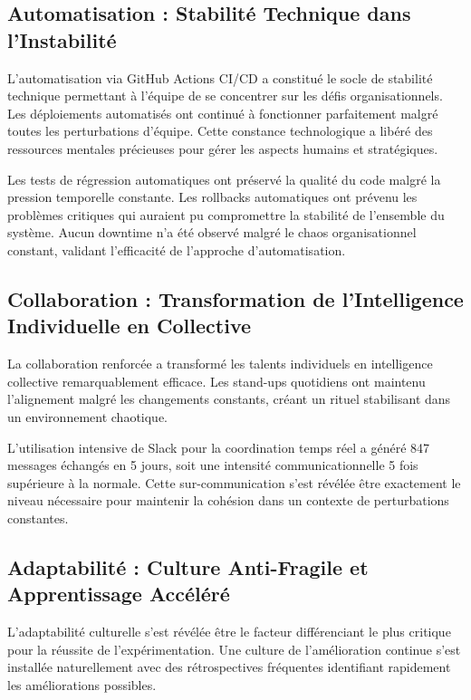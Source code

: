 \documentclass[12pt,a4paper]{article}
\begin{document}
\subsection{Automatisation : Stabilité Technique dans l'Instabilité}

L'automatisation via GitHub Actions CI/CD a constitué le socle de stabilité technique permettant à l'équipe de se concentrer sur les défis organisationnels. Les déploiements automatisés ont continué à fonctionner parfaitement malgré toutes les perturbations d'équipe. Cette constance technologique a libéré des ressources mentales précieuses pour gérer les aspects humains et stratégiques.

Les tests de régression automatiques ont préservé la qualité du code malgré la pression temporelle constante. Les rollbacks automatiques ont prévenu les problèmes critiques qui auraient pu compromettre la stabilité de l'ensemble du système. Aucun downtime n'a été observé malgré le chaos organisationnel constant, validant l'efficacité de l'approche d'automatisation.

\subsection{Collaboration : Transformation de l'Intelligence Individuelle en Collective}

La collaboration renforcée a transformé les talents individuels en intelligence collective remarquablement efficace. Les stand-ups quotidiens ont maintenu l'alignement malgré les changements constants, créant un rituel stabilisant dans un environnement chaotique.

L'utilisation intensive de Slack pour la coordination temps réel a généré 847 messages échangés en 5 jours, soit une intensité communicationnelle 5 fois supérieure à la normale. Cette sur-communication s'est révélée être exactement le niveau nécessaire pour maintenir la cohésion dans un contexte de perturbations constantes.

\subsection{Adaptabilité : Culture Anti-Fragile et Apprentissage Accéléré}

L'adaptabilité culturelle s'est révélée être le facteur différenciant le plus critique pour la réussite de l'expérimentation. Une culture de l'amélioration continue s'est installée naturellement avec des rétrospectives fréquentes identifiant rapidement les améliorations possibles.
\end{document}
